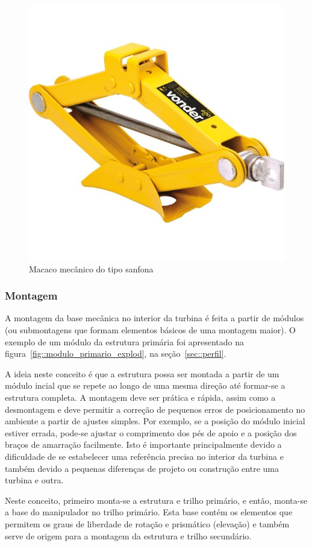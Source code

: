 \begin{figure}[h!]
	\centering
	\includegraphics[width=0.6\columnwidth]{figs/construcao/macaco_sanfona}
	\caption{Macaco mecânico do tipo sanfona}
    \label{fig::macaco_sanfona}
\end{figure}

\subsubsection{Montagem}

A montagem da base mecânica no interior da turbina é feita a partir de módulos
(ou submontagens que formam elementos básicos de uma montagem maior). O exemplo
de um módulo da estrutura primária foi apresentado na
figura~\ref{fig::modulo_primario_explod}, na seção~\ref{sec::perfil}. 

A ideia neste conceito é que a estrutura possa ser montada a partir de um módulo
incial que se repete ao longo de uma mesma direção até formar-se a estrutura
completa. A montagem deve ser prática e rápida, assim como a desmontagem e
deve permitir a correção de pequenos erros de posicionamento no
ambiente a partir de ajustes simples. Por exemplo, se a posição do módulo
inicial estiver errada, pode-se ajustar o comprimento dos pés de apoio e a
posição dos braços de amarração facilmente. Isto é importante principalmente
devido a dificuldade de se estabelecer uma referência precisa no interior da
turbina e também devido a pequenas diferenças de projeto ou construção entre uma
turbina e outra.



Neste conceito, primeiro monta-se a estrutura e trilho
primário, e então, monta-se a base do manipulador no trilho primário. Esta base
contém os elementos que permitem os graus de liberdade de rotação e prismático
(elevação) e também serve de origem para a montagem da estrutura e trilho
secundário. 

